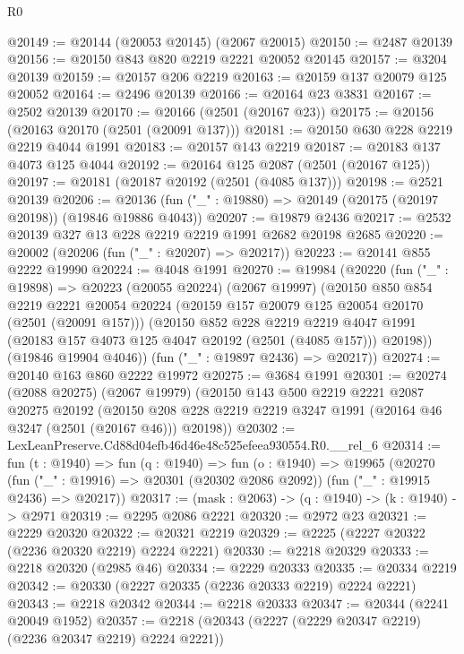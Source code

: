 \begin{lexlean}{R0}
\begin{coremodule}
@20149 := @20144 (@20053 @20145) (@2067 @20015)
@20150 := @2487 @20139
@20156 := @20150 @843 @820 @2219 @2221 @20052 @20145
@20157 := @3204 @20139
@20159 := @20157 @206 @2219
@20163 := @20159 @137 @20079 @125 @20052
@20164 := @2496 @20139
@20166 := @20164 @23 @3831
@20167 := @2502 @20139
@20170 := @20166 (@2501 (@20167 @23))
@20175 := @20156 (@20163 @20170 (@2501 (@20091 @137)))
@20181 := @20150 @630 @228 @2219 @2219 @4044 @1991
@20183 := @20157 @143 @2219
@20187 := @20183 @137 @4073 @125 @4044
@20192 := @20164 @125 @2087 (@2501 (@20167 @125))
@20197 := @20181 (@20187 @20192 (@2501 (@4085 @137)))
@20198 := @2521 @20139
@20206 := @20136 (fun ("_" : @19880) => @20149 (@20175 (@20197 @20198)) (@19846 @19886 @4043))
@20207 := @19879 @2436
@20217 := @2532 @20139 @327 @13 @228 @2219 @2219 @1991 @2682 @20198 @2685
@20220 := @20002 (@20206 (fun ("_" : @20207) => @20217))
@20223 := @20141 @855 @2222 @19990
@20224 := @4048 @1991
@20270 := @19984
    (@20220
      (fun ("_" : @19898) =>
      @20223
        (@20055 @20224)
        (@2067 @19997)
        (@20150
          @850
          @854
          @2219
          @2221
          @20054
          @20224
          (@20159 @157 @20079 @125 @20054 @20170 (@2501 (@20091 @157)))
          (@20150
            @852
            @228
            @2219
            @2219
            @4047
            @1991
            (@20183 @157 @4073 @125 @4047 @20192 (@2501 (@4085 @157)))
            @20198))
        (@19846 @19904 @4046))
      (fun ("_" : @19897 @2436) => @20217))
@20274 := @20140 @163 @860 @2222 @19972
@20275 := @3684 @1991
@20301 := @20274
    (@2088 @20275)
    (@2067 @19979)
    (@20150
      @143
      @500
      @2219
      @2221
      @2087
      @20275
      @20192
      (@20150 @208 @228 @2219 @2219 @3247 @1991 (@20164 @46 @3247 (@2501 (@20167 @46))) @20198))
@20302 := LexLeanPreserve.Cd88d04efb46d46e48c525efeea930554.R0.__rel_6
@20314 := fun (t : @1940) =>
  fun (q : @1940) =>
  fun (o : @1940) =>
  @19965
    (@20270
      (fun ("_" : @19916) => @20301 (@20302 @2086 @2092))
      (fun ("_" : @19915 @2436) => @20217))
@20317 := (mask : @2063) -> (q : @1940) -> (k : @1940) -> @2971
@20319 := @2295 @2086 @2221
@20320 := @2972 @23
@20321 := @2229 @20320
@20322 := @20321 @2219
@20329 := @2225 (@2227 @20322 (@2236 @20320 @2219) @2224 @2221)
@20330 := @2218 @20329
@20333 := @2218 @20320 (@2985 @46)
@20334 := @2229 @20333
@20335 := @20334 @2219
@20342 := @20330 (@2227 @20335 (@2236 @20333 @2219) @2224 @2221)
@20343 := @2218 @20342
@20344 := @2218 @20333
@20347 := @20344 (@2241 @20049 @1952)
@20357 := @2218 (@20343 (@2227 (@2229 @20347 @2219) (@2236 @20347 @2219) @2224 @2221))

\end{coremodule}
\end{lexlean}
